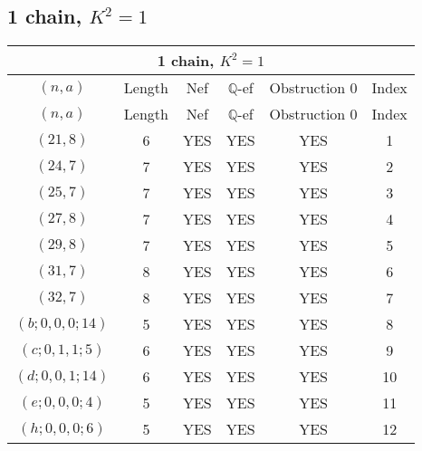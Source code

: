 \subsection{1 chain, $K^2 = 1$}
\begin{longtable}{|c|c|c|c|c|c|}
\hline
\multicolumn{6}{|c|}{1 chain, $K^2 = 1$}\\
\hline
$(n,a)$ & Length & Nef & $\mathbb Q$-ef & Obstruction 0 & Index\\
\hline
\endfirsthead

\hline
$(n,a)$ & Length & Nef & $\mathbb Q$-ef & Obstruction 0 & Index\\
\hline
\endhead
\hline
\endfoot

$(21, 8)$ & 6 & YES & YES & YES & 1\\
$(24, 7)$ & 7 & YES & YES & YES & 2\\
$(25, 7)$ & 7 & YES & YES & YES & 3\\
$(27, 8)$ & 7 & YES & YES & YES & 4\\
$(29, 8)$ & 7 & YES & YES & YES & 5\\
$(31, 7)$ & 8 & YES & YES & YES & 6\\
$(32, 7)$ & 8 & YES & YES & YES & 7\\
$(b; 0, 0, 0; 14)$ & 5 & YES & YES & YES & 8\\
$(c; 0, 1, 1; 5)$ & 6 & YES & YES & YES & 9\\
$(d; 0, 0, 1; 14)$ & 6 & YES & YES & YES & 10\\
$(e; 0, 0, 0; 4)$ & 5 & YES & YES & YES & 11\\
$(h; 0, 0, 0; 6)$ & 5 & YES & YES & YES & 12
\end{longtable}
